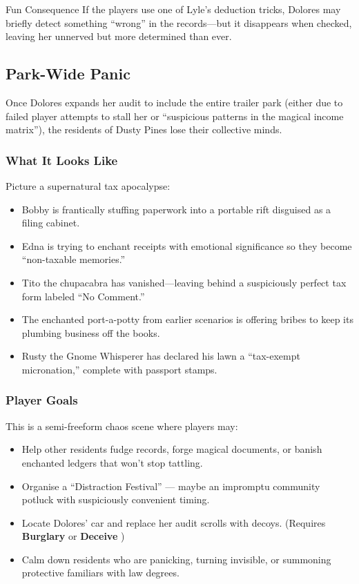 \begin{multicols}{2}
\begin{CommentBox}{Fun Consequence}
    If the players use one of Lyle’s deduction tricks, Dolores may briefly detect something “wrong” in the records—but it disappears when checked, leaving her unnerved but more determined than ever.
\end{CommentBox}


\subsection{Park-Wide Panic}

Once Dolores expands her audit to include the entire trailer park (either due to failed player attempts to stall her or “suspicious patterns in the magical income matrix”), the residents of Dusty Pines lose their collective minds.

\subsubsection*{What It Looks Like}
Picture a supernatural tax apocalypse:
\begin{itemize}
    \item Bobby is frantically stuffing paperwork into a portable rift disguised as a filing cabinet.
    \item Edna is trying to enchant receipts with emotional significance so they become “non-taxable memories.”
    \item Tito the chupacabra has vanished—leaving behind a suspiciously perfect tax form labeled “No Comment.”
    \item The enchanted port-a-potty from earlier scenarios is offering bribes to keep its plumbing business off the books.
    \item Rusty the Gnome Whisperer has declared his lawn a “tax-exempt micronation,” complete with passport stamps.
\end{itemize}

\subsubsection*{Player Goals}
This is a semi-freeform chaos scene where players may:
\begin{itemize}
    \item Help other residents fudge records, forge magical documents, or banish enchanted ledgers that won’t stop tattling.
    \item Organise a “Distraction Festival” — maybe an impromptu community potluck with suspiciously convenient timing.
    \item Locate Dolores' car and replace her audit scrolls with decoys. (Requires \textbf{Burglary} or \textbf{Deceive} )
    \item Calm down residents who are panicking, turning invisible, or summoning protective familiars with law degrees.
\end{itemize}


\end{multicols}
